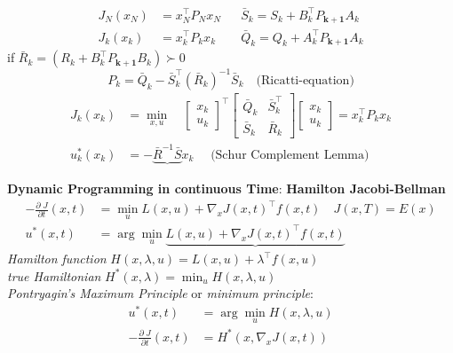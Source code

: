 \begin{tcolorbox}[colback=yellow!5!white,colframe=yellow!75!black,title=\textbf{Dynamic Programming}]
	\begin{align*}
		J_N(x_N) &= x_N^\top P_N x_N && \bar{S}_k = S_k + B_k^\top P_{\mathbf{k+1}} A_k\\
		J_k(x_k) &= x_k^\top P_k x_k &&  \bar{Q}_k = Q_k + A_k^\top P_{\mathbf{k+1}} A_k
	\end{align*}
	if $ \bar{R}_k = (R_k + B_k^\top P_{\mathbf{k+1}} B_k) \succ 0$
	\begin{equation*}
		P_k = \bar{Q}_k -\bar{S}_k ^\top (\bar{R}_k)^{-1} \bar{S}_k \quad \text{(Ricatti-equation)}
	\end{equation*}
	\begin{align*}
		J_k(x_k) &= 
		\min_{x,u}\quad
		\begin{bmatrix}
			x_k\\ u_k
		\end{bmatrix}^\top
		\begin{bmatrix}
			\bar{Q}_k & \bar{S}_k^\top\\ \bar{S}_k & \bar{R}_k
		\end{bmatrix}
		\begin{bmatrix}
			x_k\\ u_k
		\end{bmatrix}
		= x^\top_k P_k x_k\\
		u_k^*(x_k) &= - \underbrace{\bar{R}^{-1} \bar{S}} x_k \quad \text{ (Schur Complement Lemma)}
	\end{align*}

\tcblower
\textbf{Dynamic Programming in continuous Time}:
\textbf{Hamilton Jacobi-Bellman}
\begin{align*}
	- \frac{\partial\; J}{\partial t} (x, t) &= \min_u L(x,u) + \nabla_x J(x,t)^\top f(x, t) \quad J(x, T) = E(x)\\
	u^*(x,t) &= \arg \min_u \underbrace{L(x,u) + \nabla_x J(x,t)^\top f(x, t)}
\end{align*}
\textit{Hamilton function} $H(x,\lambda,u)  = L(x,u) + \lambda^\top f(x,u)$\\
\textit{true Hamiltonian} $H^*(x,\lambda) = \min_u H(x,\lambda, u)$\\
\textit{Pontryagin's Maximum Principle} or \textit{minimum principle}:\\
\begin{align*}
	 u^*(x,t) &= \arg \min_u  H(x,\lambda,u)\\
	- \frac{\partial\; J}{\partial t} (x, t)  &= H^*(x,\nabla_x J(x,t))
\end{align*}


\end{tcolorbox}
